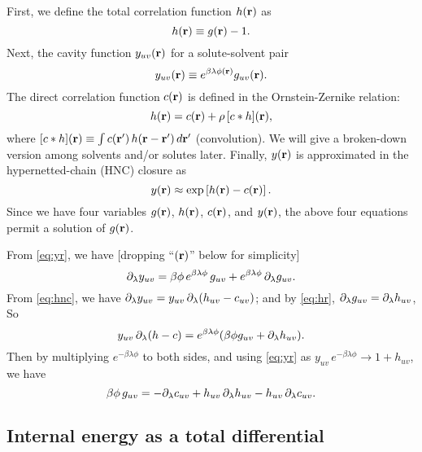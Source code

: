 \documentclass[12pt]{article}
\begin{document}
First, we define the total correlation function $h(\mathbf{r})$ as
\begin{equation}
  h(\mathbf{r}) \equiv g(\mathbf{r}) - 1.
  \label{eq:hr}
\end{equation}
%
%
%
Next, the cavity function $y_{uv}(\mathbf{r})$ for a solute-solvent pair
\begin{equation}
  y_{uv}(\mathbf{r}) \equiv e^{ \beta \lambda \phi(\mathbf{r}) } g_{uv}(\mathbf{r}).
  \label{eq:yr}
\end{equation}
%
%
%
The direct correlation function $c(\mathbf{r})$
is defined in the Ornstein-Zernike relation:
\begin{equation}
  h(\mathbf{r}) = c(\mathbf{r}) + \rho \, [c * h](\mathbf{r}),
  \label{eq:cr}
\end{equation}
where $[c*h](\mathbf{r}) \equiv \int c(\mathbf{r}') \, h(\mathbf{r} - \mathbf{r}') \, d\mathbf{r}'$
  (convolution).
We will give a broken-down version among solvents and/or solutes later.
%
%
%
%
%
%
Finally, $y(\mathbf{r})$ is approximated in the hypernetted-chain (HNC) closure as
\begin{equation}
  y(\mathbf{r}) \approx \exp\left[ h(\mathbf{r}) - c(\mathbf{r}) \right].
  \label{eq:hnc}
\end{equation}
Since we have four variables
  $g(\mathbf{r})$, $h(\mathbf{r})$, $c(\mathbf{r})$, and $y(\mathbf{r})$,
the above four equations permit a solution of $g(\mathbf{r})$.



From \eqref{eq:yr}, we have [dropping ``$(\mathbf{r})$'' below for simplicity]
\[
  \partial_\lambda y_{uv}
  =
  \beta \phi \, e^{ \beta \lambda \phi } \, g_{uv}
    +
    e^{ \beta \lambda \phi } \, \partial_\lambda g_{uv}.
\]
From \eqref{eq:hnc}, we have
  $\partial_\lambda y_{uv} = y_{uv} \, \partial_\lambda (h_{uv} - c_{uv})$;
  and by \eqref{eq:hr}, $\partial_\lambda g_{uv} = \partial_\lambda h_{uv}$, So
\[
  y_{uv} \, \partial_\lambda (h - c) = e^{\beta \lambda \phi }
  ( \beta \phi g_{uv} + \partial_\lambda h_{uv} ).
\]
Then by multiplying $e^{-\beta \lambda \phi}$ to both sides,
and using
\eqref{eq:yr}
as $y_{uv} \, e^{-\beta \lambda \phi} \rightarrow 1 + h_{uv}$,
we have
\begin{equation}
  \beta \phi \, g_{uv}
  =
  - \partial_\lambda c_{uv} + h_{uv} \, \partial_\lambda h_{uv} - h_{uv} \, \partial_\lambda c_{uv}.
  \label{eq:hc1}
\end{equation}



\subsection{Internal energy as a total differential}
\end{document}
